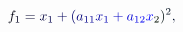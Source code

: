 \documentclass[12pt]{article}
\begin{document}
\makeatletter
\renewcommand*{\@textcolor}[3]{%
  \protect\leavevmode
  \begingroup
    \color#1{#2}#3%
  \endgroup
}
\makeatother
\begin{displaymath}
\mathcolor[RGB]{0,0,15}{f} _ { \mathcolor[RGB]{0,0,30}{1} } \mathcolor[RGB]{0,0,45}{=} \mathcolor[RGB]{0,0,60}{x} _ { \mathcolor[RGB]{0,0,75}{1} } \mathcolor[RGB]{0,0,90}{+} \mathcolor[RGB]{0,0,105}{(} \mathcolor[RGB]{0,0,120}{a} _ { \mathcolor[RGB]{0,0,135}{1} \mathcolor[RGB]{0,0,150}{1} } \mathcolor[RGB]{0,0,165}{x} _ { \mathcolor[RGB]{0,0,180}{1} } \mathcolor[RGB]{0,0,195}{+} \mathcolor[RGB]{0,0,210}{a} _ { \mathcolor[RGB]{0,0,225}{1} \mathcolor[RGB]{0,0,240}{2} } \mathcolor[RGB]{0,0,255}{x} _ { \mathcolor[RGB]{0,15,0}{2} } \mathcolor[RGB]{0,15,15}{)} ^ { \mathcolor[RGB]{0,15,30}{2} } \mathcolor[RGB]{0,15,45}{,} \,
\end{displaymath}
\end{document}
